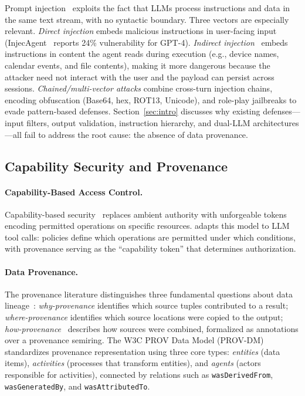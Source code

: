 Prompt injection~\cite{perez2022ignore,greshake2023not} exploits the fact that LLMs process instructions and data in the same text stream, with no syntactic boundary. Three vectors are especially relevant. \emph{Direct injection} embeds malicious instructions in user-facing input (InjecAgent~\cite{injecagent2024} reports 24\% vulnerability for GPT-4). \emph{Indirect injection}~\cite{greshake2023not} embeds instructions in content the agent reads during execution (e.g., device names, calendar events, and file contents), making it more dangerous because the attacker need not interact with the user and the payload can persist across sessions. \emph{Chained/multi-vector attacks} combine cross-turn injection chains, encoding obfuscation (Base64, hex, ROT13, Unicode), and role-play jailbreaks to evade pattern-based defenses. Section~\ref{sec:intro} discusses why existing defenses---input filters, output validation, instruction hierarchy, and dual-LLM architectures---all fail to address the root cause: the absence of data provenance.

\subsection{Capability Security and Provenance}

\paragraph{Capability-Based Access Control.}
Capability-based security~\cite{miller2006capability,capsicum} replaces ambient authority with unforgeable tokens encoding permitted operations on specific resources. \sys{} adapts this model to LLM tool calls: policies define which operations are permitted under which conditions, with provenance serving as the ``capability token'' that determines authorization.

\paragraph{Data Provenance.}
The provenance literature distinguishes three fundamental questions about data lineage~\cite{cheney2009provenance,buneman2001provenance}: \emph{why-provenance} identifies which source tuples contributed to a result; \emph{where-provenance} identifies which source locations were copied to the output; \emph{how-provenance}~\cite{green2007provenance} describes how sources were combined, formalized as annotations over a provenance semiring. The W3C PROV Data Model (PROV-DM)~\cite{prov-dm} standardizes provenance representation using three core types: \emph{entities} (data items), \emph{activities} (processes that transform entities), and \emph{agents} (actors responsible for activities), connected by relations such as \texttt{wasDerivedFrom}, \texttt{wasGeneratedBy}, and \texttt{wasAttributedTo}.


